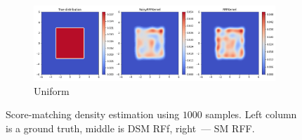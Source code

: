 \begin{figure}[H]
    \begin{subfigure}[b]{0.8\textwidth}
        \includegraphics[width=\textwidth]{figures/score_matching/2D/Uniform1000.png}
        \caption{Uniform}
    \end{subfigure}

    \caption{Score-matching density estimation using $1000$ samples.
    Left column is a ground truth, middle is DSM RFf,
    right~--- SM RFF.}
    \label{fig:2d_1000_app}
\end{figure}
